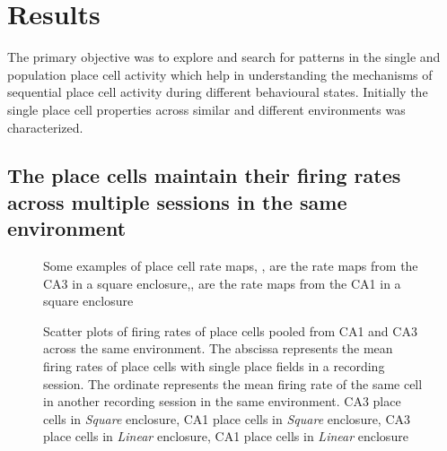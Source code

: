 \chapter{Results}
\label{results}

The primary objective was to explore and search for patterns in the single and population place cell activity which help in understanding the mechanisms of sequential place cell activity during different behavioural states. Initially the single place cell properties across similar and different environments was characterized.  

\section{The place cells maintain their firing rates across multiple sessions in the same environment}
\begin{figure}[htb!]
\label{fig:ratemaps}
\caption[Rate maps]{Some examples of place cell rate maps, ,  are the rate maps from the CA3 in a square enclosure,,  are the rate maps from the CA1 in a square enclosure}
\end{figure}

\begin{figure}[htb!]
{}

\label{fig:rateremapping}
\caption[Rate Remapping]{Scatter plots of firing rates of place cells pooled from CA1 and CA3  across the same environment. The abscissa represents the mean firing rates of place cells with single place fields in a recording session. The ordinate represents the mean firing rate of the same cell in another recording session in the same environment.  CA3 place cells in \emph{Square} enclosure,  CA1 place cells in \emph{Square} enclosure,  CA3 place cells in \emph{Linear} enclosure,  CA1 place cells in \emph{Linear} enclosure}
\end{figure}

